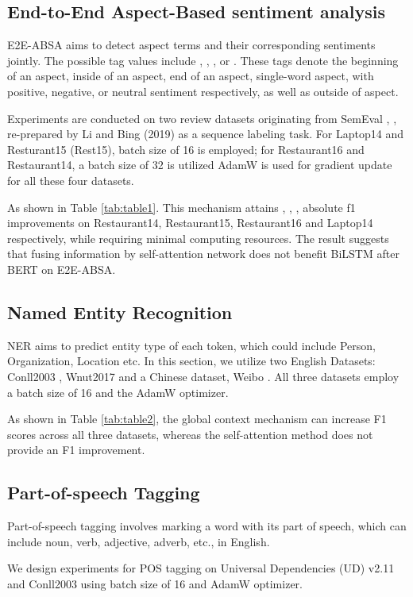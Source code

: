 \documentclass[lettersize,journal]{IEEEtran}
\begin{document}
\subsection{End-to-End Aspect-Based sentiment analysis}
E2E-ABSA aims to detect aspect terms and their corresponding sentiments jointly. The possible tag values include , 
, ,  or . These tags denote the beginning of an aspect, inside of an aspect, end of an aspect, single-word aspect, with positive, negative, or neutral sentiment respectively, as well as outside of aspect. 

Experiments are conducted on two review datasets originating from SemEval \cite{Pontiki2014}, \cite{Pontiki2015}, \cite{Pontiki2016}  re-prepared by Li and Bing (2019) \cite{Li2019} as a sequence labeling task. For Laptop14 and Resturant15 (Rest15), batch size of 16 is employed; for Restaurant16 and Restaurant14, a batch size of 32 is utilized AdamW is used for gradient update for all these four datasets.

As shown in Table \ref{tab:table1}. This mechanism attains , , ,  absolute f1 improvements on Restaurant14, Restaurant15, Restaurant16 and Laptop14 respectively, while requiring minimal computing resources. The result suggests that fusing information by self-attention network does not benefit BiLSTM after BERT on E2E-ABSA.

\subsection{Named Entity Recognition} 
NER aims to predict entity type of each token, which could include Person, Organization, Location etc. In this section, we utilize two English Datasets: Conll2003 \cite{Sang2003}, Wnut2017 \cite{Derczynski2017} and a Chinese dataset, Weibo \cite{Peng2015}. All three datasets employ a batch size of 16 and the AdamW optimizer.


As shown in Table \ref{tab:table2}, the global context mechanism can increase F1 scores across all three datasets, whereas the self-attention method does not provide an F1 improvement.

\subsection{Part-of-speech Tagging}
Part-of-speech tagging involves marking a word with its part of speech, which can include noun, verb, adjective, adverb, etc., in English.

We design experiments for POS tagging on Universal Dependencies (UD) v2.11 \cite{Silveira2014} and Conll2003 using batch size of 16 and AdamW optimizer.
\end{document}
